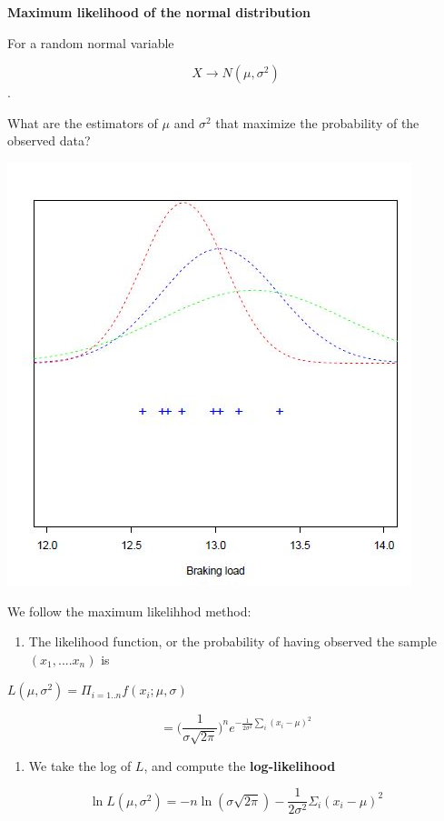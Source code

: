 \documentclass[
]{book}
\providecommand{\tightlist}{%
  \setlength{\itemsep}{0pt}\setlength{\parskip}{0pt}}
\begin{document}
\textbf{Maximum likelihood of the normal distribution}

For a random normal variable

\[X \rightarrow N(\mu, \sigma^2)\].

What are the estimators of \(\mu\) and \(\sigma^2\) that maximize the probability of the observed data?

\includegraphics{./figures/normpar.JPG}

We follow the maximum likelihhod method:

\begin{enumerate}
\def\labelenumi{\arabic{enumi}.}
\tightlist
\item
  The likelihood function, or the probability of having observed the sample \((x_1, ....x_n)\) is
\end{enumerate}

\(L(\mu, \sigma^2)=\Pi_{i=1..n} f(x_i;\mu,\sigma)\)

\[=\big( \frac{1}{\sigma \sqrt{2 \pi}}\big)^n e^{-\frac{1}{2\sigma^2} \sum_i(x_i-\mu)^2}\]

\begin{enumerate}
\def\labelenumi{\arabic{enumi}.}
\setcounter{enumi}{1}
\tightlist
\item
  We take the log of \(L\), and compute the \textbf{log-likelihood}
\end{enumerate}

\[\ln L(\mu, \sigma^2)=-n \ln(\sigma \sqrt{2 \pi})-\frac{1}{2\sigma^2} \Sigma_i(x_i-\mu)^2\]
\end{document}
